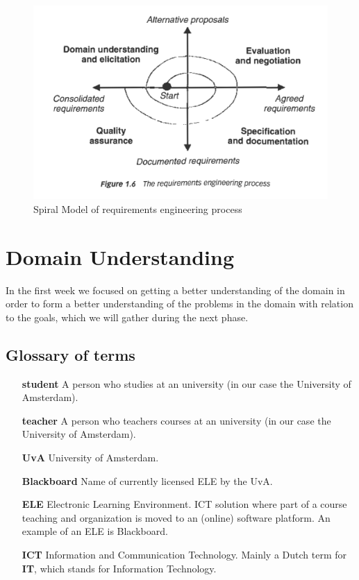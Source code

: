 \begin{figure}[h]
	\centering
	\includegraphics[width=0.75\linewidth]{images/re_process}
	\caption{Spiral Model of requirements engineering process}
	\label{fig:spiral_model}
\end{figure}


\chapter{Domain Understanding}
In the first week we focused on getting a better understanding of the domain in order to form a better understanding of the problems in the domain with relation to the goals, which we will gather during the next phase.

\section{Glossary of terms}
\begin{itemize}
	\item[\textbf{student}] A person who studies at an university (in our case the University of Amsterdam).
	\item[\textbf{teacher}] A person who teachers courses at an university (in our case the University of Amsterdam).
	\item[\textbf{UvA}] University of Amsterdam. 
	\item[\textbf{Blackboard}] Name of currently licensed ELE by the UvA. 
	\item[\textbf{ELE}] Electronic Learning Environment. ICT solution where part of a course teaching and organization is moved to an (online) software platform. An example of an ELE is Blackboard.
	\item[\textbf{ICT}] Information and Communication Technology. Mainly a Dutch term for \textbf{IT}, which stands for Information Technology.
	
\end{itemize}

